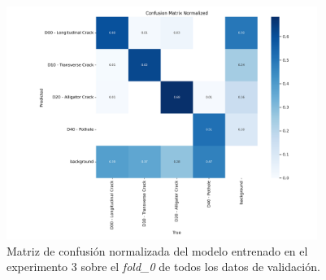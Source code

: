 \begin{figure}[H]
    \centering
    \includegraphics[width=0.9\textwidth]{img/exp3-val0-all-confusion_matrix_normalized.png}
    \caption{Matriz de confusión normalizada del modelo entrenado en el experimento 3 sobre el \textit{fold\_0} de todos los datos de validación.}
    \label{fig:exp3-val0-all-confusion_matrix_normalized}
\end{figure}